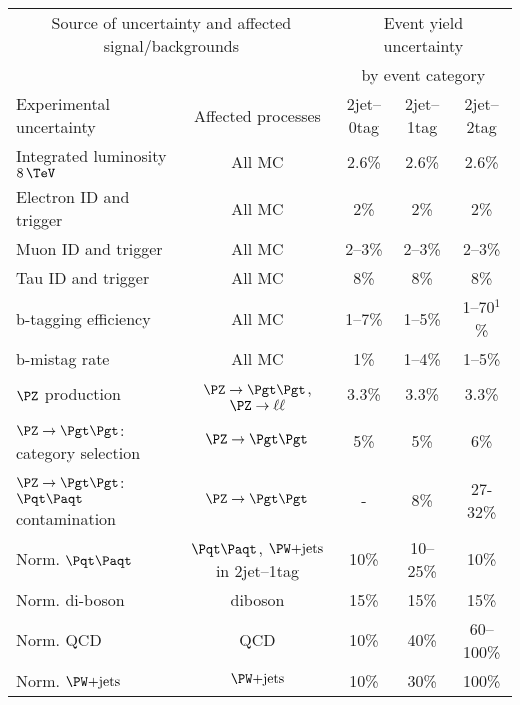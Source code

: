 
\begin{table}[tbhp]
\small
\begin{center}
    \begin{tabular}{|l|c|c|c|c|}
    \hline
    \multicolumn{2}{|c|}{Source of uncertainty and affected signal/backgrounds} & \multicolumn{3}{|c|}{Event yield uncertainty}  \\
    \multicolumn{2}{|c|}{} & \multicolumn{3}{|c|}{by event category} \\
    \hline
     Experimental uncertainty                                  & Affected processes &  2jet--0tag    &  2jet--1tag  &  2jet--2tag      \\
     \hline
     Integrated luminosity $8\,\TeV$                           & All MC & 2.6\% & 2.6\% & 2.6\%       \\
     Electron ID and trigger                                   & All MC &  2\%  & 2\%  & 2\%       \\
     Muon ID and trigger                                       & All MC & 2--3\%  &   2--3\%    & 2--3\%       \\
     Tau ID and trigger                                        & All MC & 8\%  & 8\% & 8\%           \\
     b-tagging efficiency                                      & All MC & 1--7\% & 1--5\%  & 1--70$^{1}$\% \\
     b-mistag rate                                             & All MC & 1\%  & 1--4\%  & 1--5\%       \\
     \hline
     $\PZ$ production                                          & $\ZToTauTau$, $\PZ\to\ell\ell$ & 3.3\%     &   3.3\%    & 3.3\%      \\
     $\PZ\to\Pgt\Pgt$: category selection                      & $\ZToTauTau$ & 5\%  & 5\% & 6\%        \\
     $\PZ\to\Pgt\Pgt$: $\ttbar$ contamination                  & $\ZToTauTau$ & - & 8\% & 27-32\%        \\
     Norm. $\ttbar$                                            & $\ttbar$, $\WJets$ in 2jet--1tag & 10\%  &   10--25\%  &  10\%        \\
     Norm. di-boson                                            & diboson & 15\%   &   15\%  &  15\%      \\
     Norm. QCD                                                 & QCD  & 10\% & 40\% & 60--100\%         \\
     Norm. $\WJets$                                            & $\WJets$ & 10\% &  30\% & 100\%             \\

\end{tabular}
\end{center}
\end{table}
